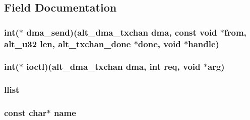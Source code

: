 \subsection{\-Field \-Documentation}
\hypertarget{structalt__dma__txchan__dev__s_a9bde2812cc0aaef511d4ed3cdacd9e67}{
\subsubsection[{dma\-\_\-send}]{\setlength{\rightskip}{0pt plus 5cm}int($\ast$ {\bf dma\-\_\-send})({\bf alt\-\_\-dma\-\_\-txchan} dma, const void $\ast$from, {\bf alt\-\_\-u32} len, {\bf alt\-\_\-txchan\-\_\-done} $\ast$done, void $\ast$handle)}}\label{structalt__dma__txchan__dev__s_a9bde2812cc0aaef511d4ed3cdacd9e67}
\hypertarget{structalt__dma__txchan__dev__s_a0bee5c0ea9d421064e4f6aabe0de3de4}{
\subsubsection[{ioctl}]{\setlength{\rightskip}{0pt plus 5cm}int($\ast$ {\bf ioctl})({\bf alt\-\_\-dma\-\_\-txchan} dma, int req, void $\ast$arg)}}\label{structalt__dma__txchan__dev__s_a0bee5c0ea9d421064e4f6aabe0de3de4}
\hypertarget{structalt__dma__txchan__dev__s_a135bc0be285afc59289210771ad9c136}{
\subsubsection[{llist}]{ {\bf llist}}}\label{structalt__dma__txchan__dev__s_a135bc0be285afc59289210771ad9c136}
\hypertarget{structalt__dma__txchan__dev__s_a8f8f80d37794cde9472343e4487ba3eb}{
\subsubsection[{name}]{\setlength{\rightskip}{0pt plus 5cm}const char$\ast$ {\bf name}}}\label{structalt__dma__txchan__dev__s_a8f8f80d37794cde9472343e4487ba3eb}
